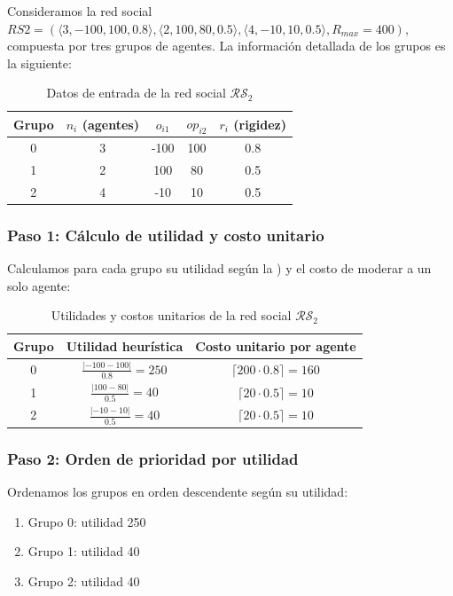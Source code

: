 \documentclass[11pt,letter]{article}
\begin{document}
Consideramos la red social $RS2 = ( \langle 3, -100, 100, 0.8 \rangle, \langle 2, 100, 80, 0.5 \rangle, \langle 4, -10, 10, 0.5 \rangle, R_{max} = 400 )$, compuesta por tres grupos de agentes. La información detallada de los grupos es la siguiente:

\begin{table}[H]
\centering
\begin{tabular}{c|c|c|c|c}
\textbf{Grupo} & $n_i$ (agentes) & $o_{i1}$ & $op_{i2}$ & $r_i$ (rigidez) \\
\hline
0 & 3 & -100 & 100 & 0.8 \\
1 & 2 & 100 & 80 & 0.5 \\
2 & 4 & -10 & 10 & 0.5 \\
\end{tabular}
\caption{Datos de entrada de la red social $\mathcal{RS}_2$}
\end{table}

\subsubsection*{Paso 1: Cálculo de utilidad y costo unitario}

Calculamos para cada grupo su utilidad según la ) y el costo de moderar a un solo agente:

\begin{table}[H]
\centering
\begin{tabular}{c|c|c}
\textbf{Grupo} & Utilidad heurística & Costo unitario por agente \\
\hline
0 & $\frac{|-100 - 100|}{0.8} = 250$ & $\lceil 200 \cdot 0.8 \rceil = 160$ \\
1 & $\frac{|100 - 80|}{0.5} = 40$ & $\lceil 20 \cdot 0.5 \rceil = 10$ \\
2 & $\frac{|-10 - 10|}{0.5} = 40$ & $\lceil 20 \cdot 0.5 \rceil = 10$ \\
\end{tabular}
\caption{Utilidades y costos unitarios de la red social $\mathcal{RS}_2$}
\end{table}

\subsubsection*{Paso 2: Orden de prioridad por utilidad}

Ordenamos los grupos en orden descendente según su utilidad:

\begin{enumerate}
    \item Grupo 0: utilidad 250
    \item Grupo 1: utilidad 40
    \item Grupo 2: utilidad 40
\end{enumerate}
\end{document}
